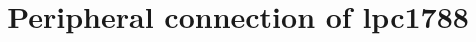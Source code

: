 \documentclass[a3paper,landscape]{article}
\title{Peripheral connection of lpc1788}
\begin{document}
\maketitle




\def \tgempty   {\cellcolor[gray]{1}}
\def \tgblock   {\cellcolor[gray]{0.8}}
\def \tgnotsel  {\cellcolor[gray]{0.7}--}
\def \tgmarked  {\cellcolor[gray]{0.5}*}


\footnotesize
\end{document}
